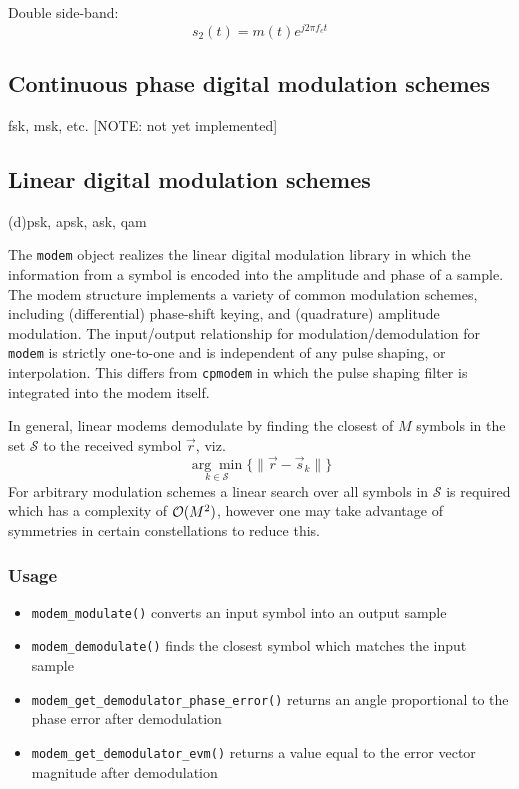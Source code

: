 Double side-band:
\[
    s_2(t) = m(t)e^{j 2 \pi f_c t}
\]

\subsection{Continuous phase digital modulation schemes}
fsk, msk, etc. [NOTE: not yet implemented]

\subsection{Linear digital modulation schemes}
(d)psk, apsk, ask, qam

The {\tt modem} object realizes the linear digital modulation library in which
the information from a symbol is encoded into the amplitude and phase of a
sample.
The modem structure implements a variety of common modulation schemes,
including (differential) phase-shift keying, and (quadrature) amplitude
modulation.
The input/output relationship for modulation/demodulation for {\tt modem} is
strictly one-to-one and is independent of any pulse shaping, or interpolation.
This differs from {\tt cpmodem} in which the pulse shaping filter is
integrated into the modem itself.

In general, linear modems demodulate by finding the closest of $M$ symbols in
the set $\mathcal{S}$ to the received symbol $\vec{r}$, viz.
\[
    \underset{k \in \mathcal{S}}{\arg\min}
    \bigl\{
        \| \vec{r} - \vec{s}_k \|
    \bigr\}
\]
For arbitrary modulation schemes a linear search over all symbols in
$\mathcal{S}$ is required which has a complexity of $\mathcal{O}(M^2)$, however one may
take advantage of symmetries in certain constellations to reduce this.

\subsubsection{Usage}
\begin{itemize}
\item[] {\tt modem\_modulate()} converts an input symbol into an output sample
\item[] {\tt modem\_demodulate()} finds the closest symbol which matches the
input sample
\item[] {\tt modem\_get\_demodulator\_phase\_error()} returns an angle
proportional to the phase error after demodulation
\item[] {\tt modem\_get\_demodulator\_evm()} returns a value equal to the
error vector magnitude after demodulation
\end{itemize}

